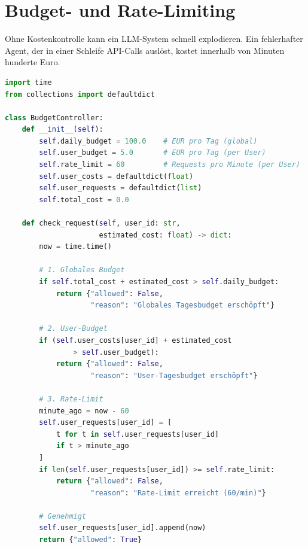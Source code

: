 
\section{Budget- und Rate-Limiting}

Ohne Kostenkontrolle kann ein LLM-System schnell explodieren. Ein fehlerhafter Agent, der in einer Schleife API-Calls auslöst, kostet innerhalb von Minuten hunderte Euro.

\begin{lstlisting}[language=Python, caption=Budget-Controller mit Rate-Limiting]
import time
from collections import defaultdict

class BudgetController:
    def __init__(self):
        self.daily_budget = 100.0    # EUR pro Tag (global)
        self.user_budget = 5.0       # EUR pro Tag (per User)
        self.rate_limit = 60         # Requests pro Minute (per User)
        self.user_costs = defaultdict(float)
        self.user_requests = defaultdict(list)
        self.total_cost = 0.0

    def check_request(self, user_id: str,
                      estimated_cost: float) -> dict:
        now = time.time()

        # 1. Globales Budget
        if self.total_cost + estimated_cost > self.daily_budget:
            return {"allowed": False,
                    "reason": "Globales Tagesbudget erschöpft"}

        # 2. User-Budget
        if (self.user_costs[user_id] + estimated_cost
                > self.user_budget):
            return {"allowed": False,
                    "reason": "User-Tagesbudget erschöpft"}

        # 3. Rate-Limit
        minute_ago = now - 60
        self.user_requests[user_id] = [
            t for t in self.user_requests[user_id]
            if t > minute_ago
        ]
        if len(self.user_requests[user_id]) >= self.rate_limit:
            return {"allowed": False,
                    "reason": "Rate-Limit erreicht (60/min)"}

        # Genehmigt
        self.user_requests[user_id].append(now)
        return {"allowed": True}


\end{lstlisting}
